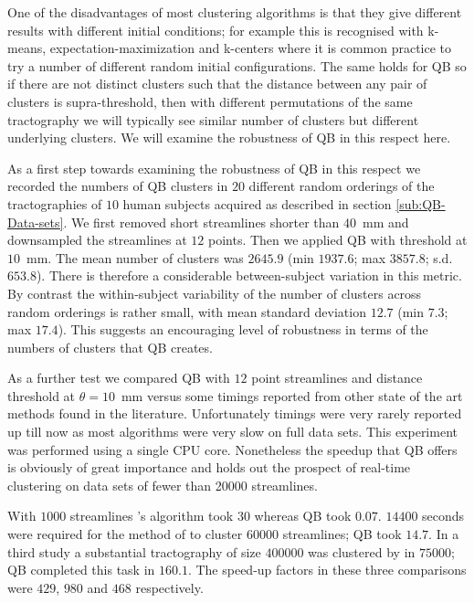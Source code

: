 \documentclass{bioinfo}
\begin{document}
One of the disadvantages of most clustering algorithms is that they give
different results with different initial conditions; for example this is
recognised with k-means, expectation-maximization
\citep{dempster1977maximum} and k-centers \citep{gonzalez1985clustering}
where it is common practice to try a number of different random initial
configurations. The same holds for QB so if there are not distinct
clusters such that the distance between any pair of clusters is
supra-threshold, then with different permutations of the same
tractography we will typically see similar number of clusters but
different underlying clusters. We will examine the robustness of QB in
this respect here.

As a first step towards examining the robustness of QB in this respect
we recorded the numbers of QB clusters in $20$ different random
orderings of the tractographies of $10$ human subjects acquired as
described in section \ref{sub:QB-Data-sets}. We first removed short
streamlines shorter than $40$~mm and downsampled the streamlines at $12$
points. Then we applied QB with threshold at $10$~mm. The mean number of
clusters was $2645.9$ (min $1937.6$; max $3857.8$; s.d.~$653.8$). There
is therefore a considerable between-subject variation in this metric. By
contrast the within-subject variability of the number of clusters across
random orderings is rather small, with mean standard deviation $12.7$
(min $7.3$; max $17.4$). This suggests an encouraging level of
robustness in terms of the numbers of clusters that QB creates.

As a further test we compared QB with $12$ point streamlines and
distance threshold at $\theta=10$~mm versus some timings reported from
other state of the art methods found in the literature. Unfortunately
timings were very rarely reported up till now as most algorithms were
very slow on full data sets. This experiment was performed using a
single CPU core. Nonetheless the speedup that QB offers is obviously of
great importance and holds out the prospect of real-time clustering on
data sets of fewer than \num{20000} streamlines.

With $\num{1000}$ streamlines \citet{wang2010tractography}'s algorithm
took $30$ whereas QB took $0.07$.  $\num{14400}$ seconds were required
for the method of \citet{wang2010tractography} to cluster $\num{60000}$
streamlines; QB took $14.7$.  In a third study a substantial
tractography of size $\num{400000}$ was clustered by \citet{Visser2010}
in $\num{75000}$; QB completed this task in $160.1$. The speed-up
factors in these three comparisons were $429$, $980$ and $468$
respectively.
\end{document}
